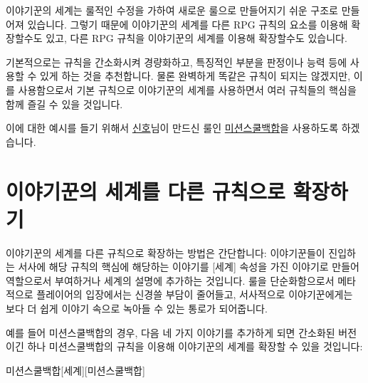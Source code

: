 \documentclass{report}
\begin{document}
	이야기꾼의 세계는 룰적인 수정을 가하여 새로운 룰으로 만들어지기 쉬운 구조로 만들어져 있습니다. 그렇기 때문에 이야기꾼의 세계를 다른 RPG 규칙의 요소를 이용해 확장할수도 있고, 다른 RPG 규칙을 이야기꾼의 세계를 이용해 확장할수도 있습니다.
	
	기본적으로는 규칙을 간소화시켜 경량화하고, 특징적인 부분을 판정이나 능력 등에 사용할 수 있게 하는 것을 추천합니다. 물론 완벽하게 똑같은 규칙이 되지는 않겠지만, 이를 사용함으로서 기본 규칙으로 이야기꾼의 세계를 사용하면서 여러 규칙들의 핵심을 함께 즐길 수 있을 것입니다.
	
	\ifprintout\else
	이에 대한 예시를 들기 위해서 \href{https://twitter.com/shinhogoesreal/}{신호}님이 만드신 룰인 \href{https://twitter.com/shinhogoesreal/status/1165797377980035073}{미션스쿨백합}을 사용하도록 하겠습니다.
	\fi
	
	\section*{이야기꾼의 세계를 다른 규칙으로 확장하기}
	이야기꾼의 세계를 다른 규칙으로 확장하는 방법은 간단합니다: 이야기꾼들이 진입하는 서사에 해당 규칙의 핵심에 해당하는 이야기를 [세계] 속성을 가진 이야기로 만들어 역할으로서 부여하거나 세계의 설명에 추가하는 것입니다. 룰을 단순화함으로서 메타적으로 플레이어의 입장에서는 신경쓸 부담이 줄어들고, 서사적으로 이야기꾼에게는 보다 더 쉽게 이야기 속으로 녹아들 수 있는 통로가 되어줍니다.
	
	\ifprintout\else
	예를 들어 미션스쿨백합의 경우, 다음 네 가지 이야기를 추가하게 되면 간소화된 버전이긴 하나 미션스쿨백합의 규칙을 이용해 이야기꾼의 세계를 확장할 수 있을 것입니다:
	
	\bigskip
	
	\begin{story}{미션스쿨백합}{[세계][미션스쿨백합]}
		
		
	\end{story}
	
\end{document}
